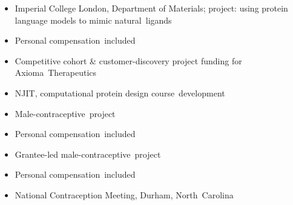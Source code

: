 \begin{itemize}
  \item Imperial College London, Department of Materials; project: using protein language models to mimic \cvkeep{}natural~\cvlast{}ligands\cvkeepend{}
  \item Personal \cvkeep{}compensation~\cvlast{}included\cvkeepend{}
\end{itemize}
\begin{itemize}
  \item Competitive cohort \& customer-discovery project funding for \cvkeep{}Axioma~\cvlast{}Therapeutics\cvkeepend{}
\end{itemize}
\begin{itemize}
  \item NJIT, computational protein design \cvkeep{}course~\cvlast{}development\cvkeepend{}
\end{itemize}
\begin{itemize}
  \item \cvkeep{}Male-contraceptive~\cvlast{}project\cvkeepend{}
  \item Personal \cvkeep{}compensation~\cvlast{}included\cvkeepend{}
\end{itemize}
\begin{itemize}
  \item Grantee-led \cvkeep{}male-contraceptive~\cvlast{}project\cvkeepend{}
  \item Personal \cvkeep{}compensation~\cvlast{}included\cvkeepend{}
\end{itemize}
\begin{itemize}
  \item National Contraception Meeting, Durham, \cvkeep{}North~\cvlast{}Carolina\cvkeepend{}
\end{itemize}
